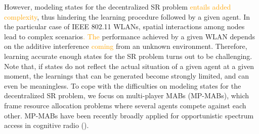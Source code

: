 \documentclass[preprint,12pt]{elsarticle}
\begin{document}
However, modeling states for the decentralized SR problem \textcolor{orange}{entails added complexity}, thus hindering the learning procedure followed by a given agent. In the particular case of IEEE 802.11 WLANs, spatial interactions among nodes lead to complex scenarios\textcolor{orange}{. The} performance achieved by a given WLAN depends on the additive interference \textcolor{orange}{coming} from an unknown environment. Therefore, learning accurate enough states for the SR problem turns out to be challenging. Note that, if states do not reflect the actual situation of a given agent at a given moment, the learnings that can be generated become strongly limited, and can even be meaningless. To cope with the difficulties on modeling states for the decentralized SR problem, we focus on multi-player MABs (MP-MABs), which frame resource allocation problems where several agents compete against each other. MP-MABs have been recently broadly applied for opportunistic spectrum access in cognitive radio (\citealp{liu2010distributed, anandkumar2011distributed, rosenski2016multi, maghsudi2015joint, maghsudi2015channel}). 
\end{document}
